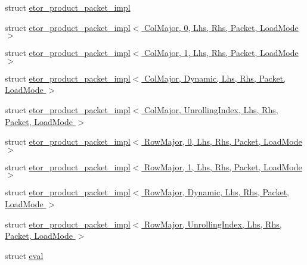 \begin{DoxyCompactItemize}
\item 
struct \hyperlink{struct_eigen_1_1internal_1_1etor__product__packet__impl}{etor\+\_\+product\+\_\+packet\+\_\+impl}
\item 
struct \hyperlink{struct_eigen_1_1internal_1_1etor__product__packet__impl_3_01_col_major_00_010_00_01_lhs_00_01_rh608f8b3bd7848082420c49062c17a738}{etor\+\_\+product\+\_\+packet\+\_\+impl$<$ Col\+Major, 0, Lhs, Rhs, Packet, Load\+Mode $>$}
\item 
struct \hyperlink{struct_eigen_1_1internal_1_1etor__product__packet__impl_3_01_col_major_00_011_00_01_lhs_00_01_rhdf96bb5795bcf311a9f62d6403dd523a}{etor\+\_\+product\+\_\+packet\+\_\+impl$<$ Col\+Major, 1, Lhs, Rhs, Packet, Load\+Mode $>$}
\item 
struct \hyperlink{struct_eigen_1_1internal_1_1etor__product__packet__impl_3_01_col_major_00_01_dynamic_00_01_lhs_01a60bbe1c1e9b0010fd66b16dd91f8f7}{etor\+\_\+product\+\_\+packet\+\_\+impl$<$ Col\+Major, Dynamic, Lhs, Rhs, Packet, Load\+Mode $>$}
\item 
struct \hyperlink{struct_eigen_1_1internal_1_1etor__product__packet__impl_3_01_col_major_00_01_unrolling_index_00_61674c8fa281095814feb5ff92eba720}{etor\+\_\+product\+\_\+packet\+\_\+impl$<$ Col\+Major, Unrolling\+Index, Lhs, Rhs, Packet, Load\+Mode $>$}
\item 
struct \hyperlink{struct_eigen_1_1internal_1_1etor__product__packet__impl_3_01_row_major_00_010_00_01_lhs_00_01_rhef6a3dfb35b15ca62240d6e9f69cec51}{etor\+\_\+product\+\_\+packet\+\_\+impl$<$ Row\+Major, 0, Lhs, Rhs, Packet, Load\+Mode $>$}
\item 
struct \hyperlink{struct_eigen_1_1internal_1_1etor__product__packet__impl_3_01_row_major_00_011_00_01_lhs_00_01_rh0bb33c71f799f63503799bf23fcbe7a3}{etor\+\_\+product\+\_\+packet\+\_\+impl$<$ Row\+Major, 1, Lhs, Rhs, Packet, Load\+Mode $>$}
\item 
struct \hyperlink{struct_eigen_1_1internal_1_1etor__product__packet__impl_3_01_row_major_00_01_dynamic_00_01_lhs_0c65718b6a3655f284deba0aadf4c1914}{etor\+\_\+product\+\_\+packet\+\_\+impl$<$ Row\+Major, Dynamic, Lhs, Rhs, Packet, Load\+Mode $>$}
\item 
struct \hyperlink{struct_eigen_1_1internal_1_1etor__product__packet__impl_3_01_row_major_00_01_unrolling_index_00_411b4c9bdf24490a5fcdbf8a014c4f10}{etor\+\_\+product\+\_\+packet\+\_\+impl$<$ Row\+Major, Unrolling\+Index, Lhs, Rhs, Packet, Load\+Mode $>$}
\item 
struct \hyperlink{struct_eigen_1_1internal_1_1eval}{eval}

\end{DoxyCompactItemize}
